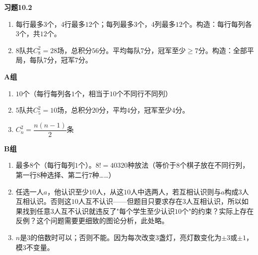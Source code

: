 \textbf{习题10.2}
\begin{enumerate}
\item 每行最多$3$个，$4$行最多$12$个；每列最多$3$个，$4$列最多$12$个。构造：每行每列各$3$个，共$12$个。
\item $8$队共$C_8^2=28$场，总积分$56$分。平均每队$7$分，冠军至少$\ge7$分。构造：全部平局，每队$7$分，冠军$7$分。
\end{enumerate}

\textbf{A组}
\begin{enumerate}
\item $10$个（每行每列各$1$个，相当于$10$个不同行不同列）
\item $5$队共$C_5^2=10$场，总积分$20$分，平均$4$分，冠军至少$4$分。
\item $C_n^2=\dfrac{n(n-1)}{2}$条
\end{enumerate}

\textbf{B组}
\begin{enumerate}
\item 最多$8$个（每行每列$1$个）。$8! = 40320$种放法（等价于$8$个棋子放在不同行列，第一行$8$种选择、第二行$7$种……）
\item 任选一人$a$，他认识至少$10$人，从这$10$人中选两人，若互相认识则与$a$构成$3$人互相认识。否则这$10$人互不认识——但题目只要求存在$3$人互相认识，所以如果找到任意$3$人互不认识就违反了"每个学生至少认识$10$个"的约束？实际上存在反例？这个问题需要更细致的图论分析，此处略。
\item $n$是$3$的倍数时可以；否则不能。因为每次改变$3$盏灯，亮灯数变化为$\pm3$或$\pm1$，模$3$不变量。
\end{enumerate}
